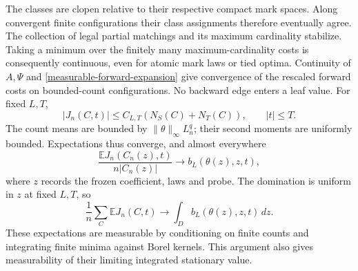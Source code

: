 \documentclass[11pt,reqno]{amsart}
\theoremstyle{definition}
\theoremstyle{remark}
\numberwithin{equation}{section}
\newcommand{\E}{\mathbb E}
\begin{document}
The classes are clopen relative to their respective compact mark spaces.
Along convergent finite configurations their class assignments therefore
eventually agree. The collection of legal partial matchings and its
maximum cardinality stabilize. Taking a minimum over the finitely many
maximum-cardinality costs is consequently continuous, even for atomic
mark laws or tied optima. Continuity of \(A,\Psi\) and
\eqref{measurable-forward-expansion} give convergence of the rescaled
forward costs on bounded-count configurations. No backward edge enters
a leaf value. For fixed \(L,T\),
\begin{equation}
\label{measurable-forward-leaf-domination}
 |J_n(C,t)|\le C_{L,T}(N_S(C)+N_T(C)),\qquad |t|\le T.
\end{equation}
The count means are bounded by \(\|\theta\|_\infty L_n^q\);
their second moments are uniformly bounded. Expectations thus converge,
and almost everywhere
\[
 \frac{\E J_n(C_n(z),t)}{n|C_n(z)|}
        \longrightarrow b_L(\theta(z),z,t),
\]
where \(z\) records the frozen coefficient, laws and probe.
The domination is uniform in \(z\) at fixed \(L,T\), so
\begin{equation}
\label{measurable-forward-leaf-integral}
 \frac1n\sum_C\E J_n(C,t)
       \longrightarrow\int_D b_L(\theta(z),z,t)\,dz.
\end{equation}
These expectations are measurable by conditioning on finite counts
and integrating finite minima against Borel kernels. This argument
also gives measurability of their limiting integrated stationary value.
\end{document}
